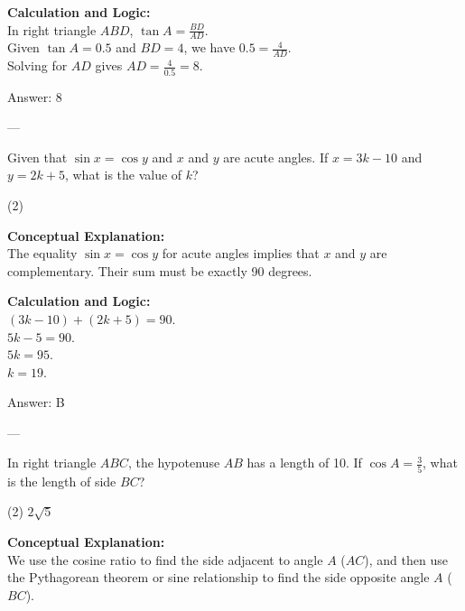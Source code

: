 \documentclass[11pt,paper=a4,answers]{exam}
\begin{document}
\begin{questions}
\begin{solution}
\vspace{10pt}
\textbf{Calculation and Logic:} \\
In right triangle $ABD$, $\tan A = \frac{BD}{AD}$. \\
Given $\tan A = 0.5$ and $BD = 4$, we have $0.5 = \frac{4}{AD}$. \\
Solving for $AD$ gives $AD = \frac{4}{0.5} = 8$.

\vspace{15pt}
Answer: \colorbox{yellow!100}{8}
\end{solution}

---

\question
Given that $\sin x = \cos y$ and $x$ and $y$ are acute angles. If $x = 3k - 10$ and $y = 2k + 5$, what is the value of $k$?
\begin{tasks}(2)
\end{tasks}

\begin{solution}
\textbf{Conceptual Explanation:} \\
The equality $\sin x = \cos y$ for acute angles implies that $x$ and $y$ are complementary. Their sum must be exactly 90 degrees.

\vspace{10pt}
\textbf{Calculation and Logic:} \\
$(3k - 10) + (2k + 5) = 90$. \\
$5k - 5 = 90$. \\
$5k = 95$. \\
$k = 19$.

\vspace{15pt}
Answer: \colorbox{yellow!100}{B}
\end{solution}

---

\question
In right triangle $ABC$, the hypotenuse $AB$ has a length of 10. If $\cos A = \frac{3}{5}$, what is the length of side $BC$?
\begin{tasks}(2)
    \task $2\sqrt{5}$
\end{tasks}

\begin{solution}
\textbf{Conceptual Explanation:} \\
We use the cosine ratio to find the side adjacent to angle $A$ ($AC$), and then use the Pythagorean theorem or sine relationship to find the side opposite angle $A$ ($BC$).


\end{solution}
\end{questions}
\end{document}

